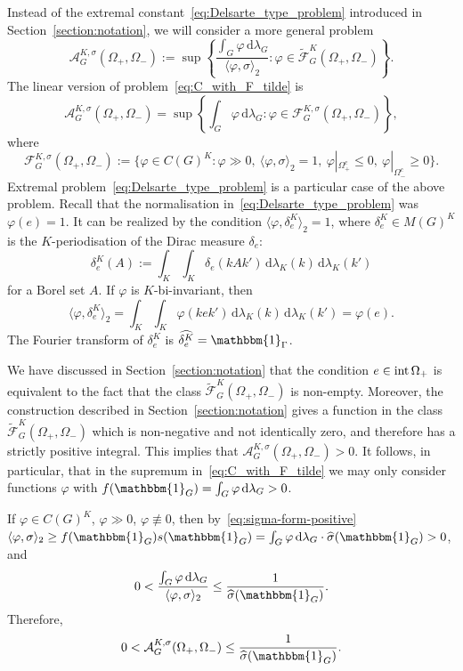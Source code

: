 \documentclass[[a4paper,english,12pt]{amsart}
\theoremstyle{plain}
\theoremstyle{remark}
\newcommand{\intt}{\mbox{\rm int\,}}
\newcommand{\ff}{\varphi}
\begin{document}
Instead of the extremal constant~\eqref{eq:Delsarte_type_problem} introduced in Section~\ref{section:notation}, we will consider a more general problem
\begin{equation}\label{eq:C_with_F_tilde}
\mathcal{A}^{K,\sigma}_G(\Omega_+, \Omega_{-}) :=  \sup \left\{ \frac{ \int_G \ff \,\mbox{d} \lambda_G}{ \langle \ff, \sigma \rangle_2 }  : \varphi \in \widetilde{\mathcal{F}}^K_G(\Omega_+, \Omega_-) \right\}. 
\end{equation}
The linear version of problem~\eqref{eq:C_with_F_tilde} is
$$
\mathcal{A}^{K,\sigma}_G(\Omega_+, \Omega_{-}) = \sup \left\{\int_G \varphi \, \mbox{d}\lambda_G : \varphi \in \mathcal{F}^{K,\sigma}_G(\Omega_+, \Omega_-)  \right\},
$$
where
$$
\mathcal{F}^{K,\sigma}_G(\Omega_+, \Omega_-) := \{ \varphi \in C(G)^K : \varphi  \gg 0, \ \langle \ff, \sigma \rangle_2 = 1, \  \varphi|_{\Omega_+^c} \le 0, \  \varphi|_{\Omega_-^c} \ge 0 \}.
$$
Extremal problem~\eqref{eq:Delsarte_type_problem} is a particular case of the above problem. Recall that the normalisation in~\eqref{eq:Delsarte_type_problem} was $\ff(e) = 1$. It can be realized by the condition $\langle \ff, \delta_e^K \rangle_2 = 1$, where $\delta_e^K \in M(G)^K$ is the $K$-periodisation of the Dirac measure $\delta_e$:
$$
\delta_e^K(A) := \int_K \int_K \delta_e(kAk') \, \mbox{d} \lambda_K(k) \, \mbox{d} \lambda_K(k')
$$
for a Borel set $A$. If $\ff$ is $K$-bi-invariant, then 
$$
\langle \ff, \delta_e^K \rangle_2 = \int_K \int_K \ff(kek') \, \mbox{d} \lambda_K(k) \, \mbox{d} \lambda_K(k') = \ff(e).
$$
The Fourier transform of $\delta_e^K$ is $\widehat{\delta_e^K} = \mathbbm{1}_\Gamma$.

We have discussed in Section~\ref{section:notation} that the condition $e \in \intt{\Omega_+}$ is equivalent to the fact that the class $\widetilde{\mathcal{F}}^K_G(\Omega_+, \Omega_-)$ is non-empty. Moreover, the construction described in Section~\ref{section:notation} gives a function in the class $\widetilde{\mathcal{F}}^K_G(\Omega_+, \Omega_-)$ which is non-negative and not identically zero, and therefore has a strictly positive integral. This implies that $\mathcal{A}^{K,\sigma}_G(\Omega_+, \Omega_{-}) > 0$. It follows, in particular, that in the supremum in~\eqref{eq:C_with_F_tilde} we may only consider functions $\ff$ with $f(\mathbbm{1}_{G}) = \int_G \ff \,\mbox{d} \lambda_G > 0$.

If $\varphi \in C(G)^K$, $\ff \gg 0$, $\ff \not\equiv 0$, then by~\eqref{eq:sigma-form-positive}
$\langle \varphi, \sigma \rangle_2 \ge f(\mathbbm{1}_G) s(\mathbbm{1}_G) = \int_G \ff \,\mbox{d}\lambda_G \cdot \widehat{\sigma}(\mathbbm{1}_G) > 0$,
and
$$
0 < \frac{ \int_G \ff \,\mbox{d} \lambda_G}{ \langle \ff, \sigma \rangle_2 } \le \frac{1}{\widehat{\sigma}(\mathbbm{1}_G)}.
$$
Therefore,
$$
0 < \mathcal{A}^{K,\sigma}_G(\Omega_+, \Omega_{-}) \le \frac{1}{\widehat{\sigma}(\mathbbm{1}_G)}.
$$
\end{document}
